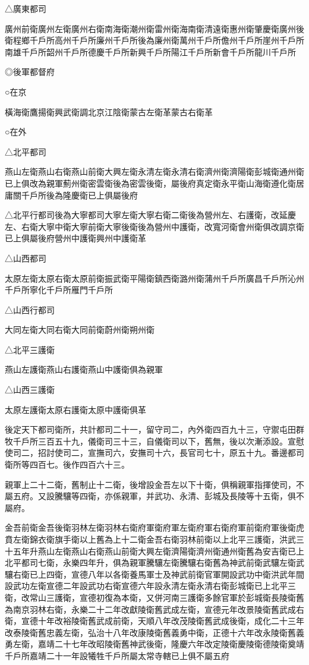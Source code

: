 △廣東都司

廣州前衛廣州左衛廣州右衛南海衛潮州衛雷州衛海南衛清遠衛惠州衛肇慶衛廣州後衛程鄉千戶所高州千戶所廉州千戶所後為廉州衛萬州千戶所儋州千戶所崖州千戶所南雄千戶所韶州千戶所德慶千戶所新興千戶所陽江千戶所新會千戶所龍川千戶所

◎後軍都督府

○在京

橫海衛鷹揚衛興武衛調北京江陰衛蒙古左衛革蒙古右衛革

○在外

△北平都司

燕山左衛燕山右衛燕山前衛大興左衛永清左衛永清右衛濟州衛濟陽衛彭城衛通州衛已上俱改為親軍薊州衛密雲衛後為密雲後衛，屬後府真定衛永平衛山海衛遵化衛居庸關千戶所後為隆慶衛已上俱屬後府

△北平行都司後為大寧都司大寧左衛大寧右衛二衛後為營州左、右護衛，改延慶左、右衛大寧中衛大寧前衛大寧後衛後為營州中護衛，改寬河衛會州衛俱改調京衛已上俱屬後府營州中護衛興州中護衛革

△山西都司

太原左衛太原右衛太原前衛振武衛平陽衛鎮西衛潞州衛蒲州千戶所廣昌千戶所沁州千戶所寧化千戶所雁門千戶所

△山西行都司

大同左衛大同右衛大同前衛蔚州衛朔州衛

△北平三護衛

燕山左護衛燕山右護衛燕山中護衛俱為親軍

△山西三護衛

太原左護衛太原右護衛太原中護衛俱革

後定天下都司衛所，共計都司二十一，留守司二，內外衛四百九十三，守禦屯田群牧千戶所三百五十九，儀衛司三十三，自儀衛司以下，舊無，後以次漸添設。宣慰使司二，招討使司二，宣撫司六，安撫司十六，長官司七十，原五十九。番邊都司衛所等四百七。後作四百六十三。

親軍上二十二衛，舊制止十二衛，後增設金吾左以下十衛，俱稱親軍指揮使司，不屬五府。又設騰驤等四衛，亦係親軍，并武功、永清、彭城及長陵等十五衛，俱不屬府。

金吾前衛金吾後衛羽林左衛羽林右衛府軍衛府軍左衛府軍右衛府軍前衛府軍後衛虎賁左衛錦衣衛旗手衛以上舊為上十二衛金吾右衛羽林前衛以上北平三護衛，洪武三十五年升燕山左衛燕山右衛燕山前衛大興左衛濟陽衛濟州衛通州衛舊為安吉衛已上北平都司七衛，永樂四年升，俱為親軍騰驤左衛騰驤右衛舊為神武前衛武驤左衛武驤右衛已上四衛，宣德八年以各衛養馬軍士及神武前衛官軍開設武功中衛洪武年間設武功左衛宣德二年設武功右衛宣德六年設永清左衛永清右衛彭城衛已上北平三衛，改常山三護衛，宣德初復為本衛，又併河南三護衛多餘官軍於彭城衛長陵衛舊為南京羽林右衛，永樂二十二年改獻陵衛舊武成左衛，宣德元年改景陵衛舊武成右衛，宣德十年改裕陵衛舊武成前衛，天順八年改茂陵衛舊武成後衛，成化二十三年改泰陵衛舊忠義左衛，弘治十八年改康陵衛舊義勇中衛，正德十六年改永陵衛舊義勇左衛，嘉靖二十七年改昭陵衛舊神武後衛，隆慶六年改定陵衛慶陵衛德陵衛奠靖千戶所嘉靖二十一年設犧牲千戶所屬太常寺轄已上俱不屬五府

